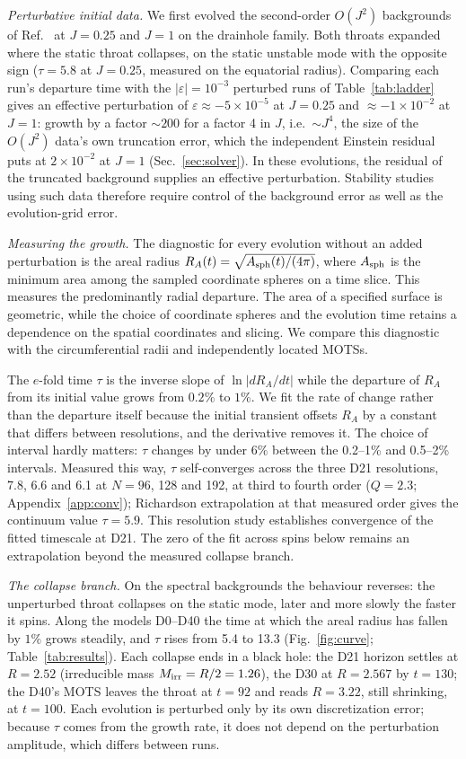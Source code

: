 \documentclass[twocolumn,floatfix,aps,prd,superscriptaddress,nofootinbib]{revtex4-2}
\begin{document}
\emph{Perturbative initial data.} We first evolved the second-order $O(J^2)$ backgrounds of Ref.~\cite{azad2024} at $J=0.25$ and $J=1$ on the drainhole family. Both throats expanded where the static throat collapses, on the static unstable mode with the opposite sign ($\tau=5.8$ at $J=0.25$, measured on the equatorial radius). Comparing each run's departure time with the $|\varepsilon|=10^{-3}$ perturbed runs of Table~\ref{tab:ladder} gives an effective perturbation of $\varepsilon\approx-5\times10^{-5}$ at $J=0.25$ and ${\approx}-1\times10^{-2}$ at $J=1$: growth by a factor ${\sim}200$ for a factor 4 in $J$, i.e.\ ${\sim}J^4$, the size of the $O(J^2)$ data's own truncation error, which the independent Einstein residual puts at $2\times10^{-2}$ at $J=1$ (Sec.~\ref{sec:solver}). In these evolutions, the residual of the truncated background supplies an effective perturbation. Stability studies using such data therefore require control of the background error as well as the evolution-grid error.

\emph{Measuring the growth.} The diagnostic for every evolution without an added perturbation is the areal radius $R_A(t)=\sqrt{A_{\rm sph}(t)/(4\pi)}$, where $A_{\rm sph}$ is the minimum area among the sampled coordinate spheres on a time slice. This measures the predominantly radial departure. The area of a specified surface is geometric, while the choice of coordinate spheres and the evolution time retains a dependence on the spatial coordinates and slicing. We compare this diagnostic with the circumferential radii and independently located MOTSs.

The $e$-fold time $\tau$ is the inverse slope of $\ln|dR_A/dt|$ while the departure of $R_A$ from its initial value grows from $0.2\%$ to $1\%$. We fit the rate of change rather than the departure itself because the initial transient offsets $R_A$ by a constant that differs between resolutions, and the derivative removes it. The choice of interval hardly matters: $\tau$ changes by under $6\%$ between the 0.2--1\% and 0.5--2\% intervals. Measured this way, $\tau$ self-converges across the three D21 resolutions, 7.8, 6.6 and 6.1 at $N=96$, 128 and 192, at third to fourth order ($Q=2.3$; Appendix~\ref{app:conv}); Richardson extrapolation at that measured order gives the continuum value $\tau=5.9$. This resolution study establishes convergence of the fitted timescale at D21. The zero of the fit across spins below remains an extrapolation beyond the measured collapse branch.

\emph{The collapse branch.} On the spectral backgrounds the behaviour reverses: the unperturbed throat collapses on the static mode, later and more slowly the faster it spins. Along the models D0--D40 the time at which the areal radius has fallen by $1\%$ grows steadily, and $\tau$ rises from 5.4 to 13.3 (Fig.~\ref{fig:curve}; Table~\ref{tab:results}). Each collapse ends in a black hole: the D21 horizon settles at $R=2.52$ (irreducible mass $M_{\rm irr}=R/2=1.26$), the D30 at $R=2.567$ by $t=130$; the D40's MOTS leaves the throat at $t=92$ and reads $R=3.22$, still shrinking, at $t=100$. Each evolution is perturbed only by its own discretization error; because $\tau$ comes from the growth rate, it does not depend on the perturbation amplitude, which differs between runs.
\end{document}
